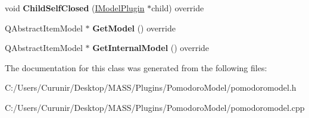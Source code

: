 \begin{DoxyCompactItemize}
\mbox{\label{class_pomodoro_model_a90ce59705d85cc0cf463cf7cedb71c03}} 
void {\bfseries Child\+Self\+Closed} (\hyperlink{class_i_model_plugin}{I\+Model\+Plugin} $\ast$child) override
\item 
\mbox{\label{class_pomodoro_model_a809e190e4f57bd457978aa8e007229b7}} 
Q\+Abstract\+Item\+Model $\ast$ {\bfseries Get\+Model} () override
\item 
\mbox{\label{class_pomodoro_model_a3d96a6b665bdfc0b3fbad7411775a762}} 
Q\+Abstract\+Item\+Model $\ast$ {\bfseries Get\+Internal\+Model} () override
\end{DoxyCompactItemize}


The documentation for this class was generated from the following files\+:\begin{DoxyCompactItemize}
\item 
C\+:/\+Users/\+Curunir/\+Desktop/\+M\+A\+S\+S/\+Plugins/\+Pomodoro\+Model/pomodoromodel.\+h\item 
C\+:/\+Users/\+Curunir/\+Desktop/\+M\+A\+S\+S/\+Plugins/\+Pomodoro\+Model/pomodoromodel.\+cpp\end{DoxyCompactItemize}
